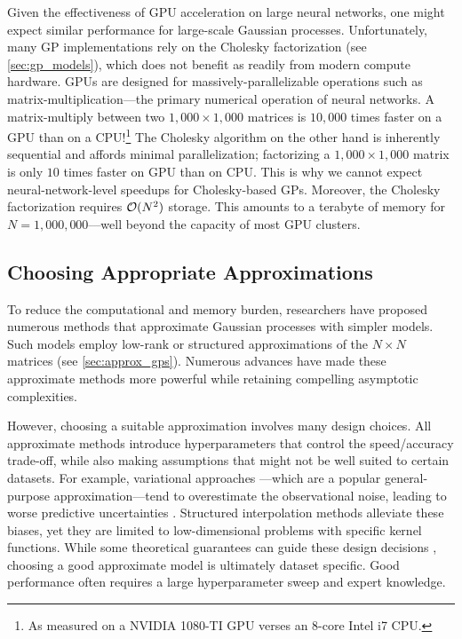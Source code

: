 Given the effectiveness of GPU acceleration on large neural networks, one might expect similar performance for large-scale Gaussian processes.
Unfortunately, many GP implementations rely on the Cholesky factorization (see \cref{sec:gp_models}), which does not benefit as readily from modern compute hardware.
GPUs are designed for massively-parallelizable operations such as matrix-multiplication---the primary numerical operation of neural networks.
A matrix-multiply between two $1,\!000 \times 1,\!000$ matrices is $10,\!000$ times faster on a GPU than on a CPU!\footnote{
	As measured on a NVIDIA 1080-TI GPU verses an 8-core Intel i7 CPU.
}
The Cholesky algorithm on the other hand is inherently sequential and affords minimal parallelization;
factorizing a $1,\!000 \times 1,\!000$ matrix is only $10$ times faster on GPU than on CPU.
This is why we cannot expect neural-network-level speedups for Cholesky-based GPs.
Moreover, the Cholesky factorization requires $\bigo{N^2}$ storage.
This amounts to a terabyte of memory for $N=1,\!000,\!000$---well beyond the capacity of most GPU clusters.

\subsection{Choosing Appropriate Approximations}
To reduce the computational and memory burden, researchers have proposed numerous methods that approximate Gaussian processes with simpler models.
Such models employ low-rank or structured approximations of the $N \times N$ matrices (see \cref{sec:approx_gps}).
Numerous advances have made these approximate methods more powerful while retaining compelling asymptotic complexities.

However, choosing a suitable approximation involves many design choices.
All approximate methods introduce hyperparameters that control the speed/accuracy trade-off, while also making assumptions that might not be well suited to certain datasets.
For example, variational approaches \cite{titsias2009variational}---which are a popular general-purpose approximation---tend to overestimate the observational noise, leading to worse predictive uncertainties \cite{turner2011two,bauer2016understanding}.
Structured interpolation methods \cite{wilson2015kernel} alleviate these biases, yet they are limited to low-dimensional problems with specific kernel functions.
While some theoretical guarantees can guide these design decisions \cite{burt2019rates}, choosing a good approximate model is ultimately dataset specific.
Good performance often requires a large hyperparameter sweep and expert knowledge.

